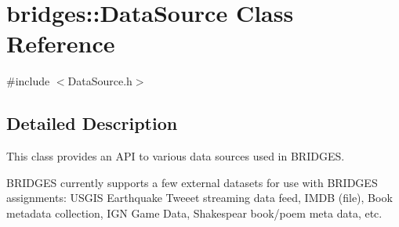 \hypertarget{classbridges_1_1_data_source}{}\section{bridges\+::Data\+Source Class Reference}
\label{classbridges_1_1_data_source}


{\ttfamily \#include $<$Data\+Source.\+h$>$}



\subsection{Detailed Description}
This class provides an A\+PI to various data sources used in B\+R\+I\+D\+G\+ES. 

B\+R\+I\+D\+G\+ES currently supports a few external datasets for use with B\+R\+I\+D\+G\+ES assignments\+: U\+S\+G\+IS Earthquake Tweeet streaming data feed, I\+M\+DB (file), Book metadata collection, I\+GN Game Data, Shakespear book/poem meta data, etc.

